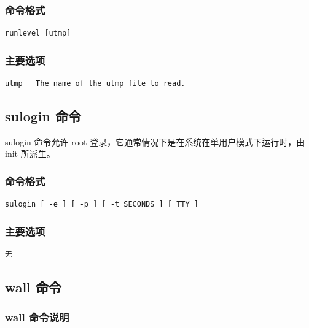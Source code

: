\subsubsection{命令格式}

{\begin{shaded}\begin{verbatim}
runlevel [utmp]
\end{verbatim}\end{shaded}}
\subsubsection{主要选项}

{\begin{shaded}\begin{verbatim}
utmp   The name of the utmp file to read.
\end{verbatim}\end{shaded}}
\subsection{sulogin 命令}

sulogin 命令允许 root 登录，它通常情况下是在系统在单用户模式下运行时，由
init 所派生。

\subsubsection{命令格式}

{\begin{shaded}\begin{verbatim}
sulogin [ -e ] [ -p ] [ -t SECONDS ] [ TTY ]
\end{verbatim}\end{shaded}}
\subsubsection{主要选项}

{\begin{shaded}\begin{verbatim}
无
\end{verbatim}\end{shaded}}
\subsection{wall 命令}

\subsubsection{wall 命令说明}

